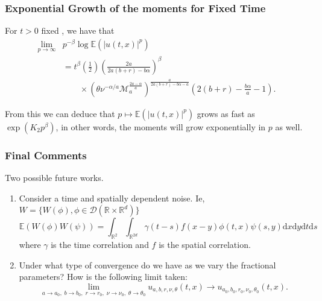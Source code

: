 \documentclass{beamer}
\numberwithin{equation}{section}
\newcommand{\R}{\mathbb{R}}
\newcommand{\E}{\mathbb{E}}
\newcommand{\ud}{\ensuremath{\mathrm{d}}}
\begin{document}
		\begin{frame}[t]
		\frametitle{Exponential Growth of the moments for Fixed Time}
		\begin{theorem} For $t>0$ fixed , we have that
			\begin{align*}
	\lim_{p \to \infty} &  p^{-\beta} \log \E\left(|u(t,x)|^p\right) 
	\\ &=  t^\beta \left(\frac{1}{2}\right)\left(\frac{2a}{2a(b+r)- b\alpha} \right)^\beta \\
	& \quad \quad \times \left(\theta\nu^{-\alpha/a} \mathcal{M}_a^{\frac{2a-\alpha}{a}}\right)^{\frac{a}{2a(b+r)-b\alpha-a}}\left(2(b+r)-\frac{b\alpha}{a}-1\right).
	\end{align*}
			\end{theorem}
From this we can deduce that $p \mapsto \mathbb{E}(|u(t,x)|^p)$ grows as fast as $\exp\left({K_2 p^\beta }\right)$, in other words, the moments will grow exponentially in $p$ as well. 
	
		\end{frame}

	\begin{frame}[t]
		\frametitle{Final Comments}
			Two possible future works.
				\begin{enumerate}
					\item Consider a time and spatially dependent noise. Ie, $W = \{W(\phi), \phi \in \mathcal{D}(\R \times \R^d)\}$
						\[
							\mathbb{E}(W(\phi)W(\psi)) = \int_{\R^{2}}\int_{\R^{2d}} \gamma(t-s)f(x-y)\phi(t,x)\psi(s,y) \ud x\ud y \ud t \ud s
						\]
					where $\gamma$ is the time correlation and $f$ is the spatial correlation. 
					\item Under what type of convergence do we have as we vary the fractional parameters? How is the following limit taken:
						\[
							\lim_{a \to a_0, \; b \to b_0, \; r \to r_0, \; \nu \to \nu_0, \; \theta \to \theta_0} u_{a,b,r,\nu,\theta}(t,x) \to u_{a_0,b_0,r_0,\nu_0,\theta_0}(t,x).
						\]
					
				\end{enumerate}
			
	\end{frame}
\end{document}
